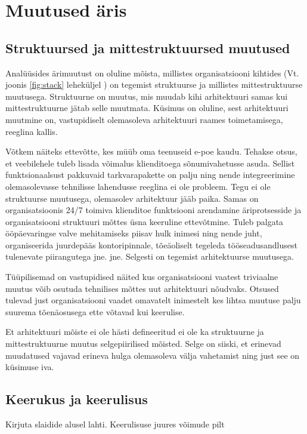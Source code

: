 \chapter{Muutused äris}

\section{Struktuursed ja mittestruktuursed muutused}
Analüüsides ärimuutust on oluline mõista, millistes organisatsiooni kihtides (Vt. joonis \ref{fig:stack} leheküljel \pageref{fig:stack}) on tegemist struktuurse ja millistes mittestruktuurse muutusega. Struktuurne on muutus, mis muudab kihi arhitektuuri samas kui mittestruktuurne jätab selle muutmata. Küsimus on oluline, sest arhitektuuri muutmine on, vastupidiselt olemasoleva arhitektuuri raames toimetamisega, reeglina kallis.

Võtkem näiteks ettevõtte, kes müüb oma teenuseid e-poe kaudu. Tehakse otsus, et veebilehele tuleb lisada võimalus klienditoega sõnumivahetusse asuda. Sellist funktsionaalsust pakkuvaid tarkvarapakette on palju ning nende integreerimine olemasolevasse tehnilisse lahendusse reeglina ei ole probleem. Tegu ei ole struktuurse muutusega, olemasolev arhitektuur jääb paika. Samas on organisatsioonis 24/7 toimiva klienditoe funktsiooni arendamine äriprotsesside ja organisatsiooni struktuuri mõttes üsna keeruline ettevõtmine. Tuleb palgata ööpäevaringse valve mehitamiseks piisav hulk inimesi ning nende juht, organiseerida juurdepääs kontoripinnale, tõeäoliselt tegeleda tööseadusandlusest tulenevate piirangutega jne. jne. Selgesti on tegemist arhitektuurse muutusega. 

Tüüpilisemad on vastupidised näited kus organisatsiooni vaatest triviaalne muutus võib osutuda tehnilises mõttes uut arhitektuuri nõudvaks. Otsused tulevad just organisatsiooni vaadet omavatelt inimestelt kes lihtsa muutuse palju suurema tõenäosusega ette võtavad kui keerulise. 

Et arhitektuuri mõiste ei ole hästi defineeritud ei ole ka struktuurne ja mittestruktuurne muutus selgepiirilised mõisted. Selge on siiski, et erinevad muudatused vajavad erineva hulga olemasoleva välja vahetamist ning just see on küsimuse iva.

\section{Keerukus ja keerulisus}
\TODO Kirjuta slaidide alusel lahti. Keerulisuse juures võimude pilt

